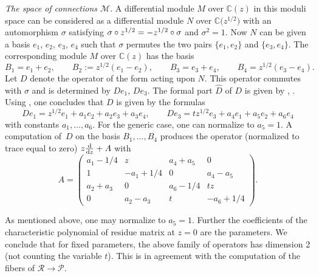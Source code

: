\documentclass[pdftex]{sigma}
\numberwithin{equation}{section}
\begin{document}
{\it The space of connections $\mathcal{M}$}.
 A differential module $M$ over $\mathbb{C}(z)$ in this moduli space can be considered as a differential module $N$ over $\mathbb{C}\bigl(z^{1/2}\bigr)$
 with an automorphism $\sigma$ satisfying $\sigma \circ z^{1/2}=\smash{-z^{1/2}}\circ \sigma$ and $\sigma ^2=1$. Now $N$ can be given a basis $e_1$, $e_2$, $e_3$, $e_4$ such that $\sigma$
 permutes the two pairs $\{e_1,e_2\}$ and $\{e_3,e_4\}$. The corresponding module $M$ over $\mathbb{C}(z)$ has the basis
 \[ B_1=e_1+e_2,\qquad B_2:=z^{1/2}(e_1-e_2),\qquad B_3=e_3+e_4,\qquad B_4=z^{1/2}(e_3-e_4).\]
 Let $D$ denote the operator of the form 
 acting upon $N$. This operator commutes with $\sigma$ and is determined by $De_1$, $De_3$. The formal part $\hat{D}$ of $D$ is given by
 , . Using \cite[Section~12]{vdP-Si}, one concludes that $D$ is given by the formulas
 \[ De_1=z^{1/2}e_1+a_1e_2+a_2e_3+a_3e_4,\qquad De_3=tz^{1/2}e_3+a_4e_1+a_5e_2+a_6e_4 \]
 with constants $a_1,\dots ,a_6$. For the generic case, one can normalize to $a_5=1$. A computation of~$D$ on the basis
 $B_1,\dots , B_4$ produces the operator (normalized to trace equal to zero)
 $ z\frac{{\rm d}}{{\rm d}z}+A$ with
 \[A=\begin{pmatrix} a_1-1/4 & z& a_4+a_5&0 \\ 1& -a_1+1/4&0 & a_4-a_5\\ a_2+a_3& 0&a_6-1/4 & tz\\ 0&a_2-a_3 & t & -a_6+1/4 \end{pmatrix}.\]

 As mentioned above, one may normalize to $a_5=1$. Further the coefficients of the characteristic polynomial of residue matrix at $z=0$ are
 the parameters. We conclude that for fixed parameters, the above family of operators has dimension 2 (not counting the variable $t$). This is in
 agreement with the computation of the fibers of $\mathcal{R}\rightarrow \mathcal{P}$.
\end{document}
